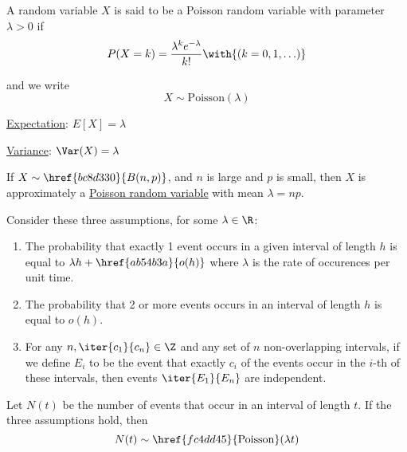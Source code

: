 \label{fc4dd45}

A random variable $X$ is said to be a Poisson random variable with parameter
$\lambda>0$ if
$$
  P(X=k)=\frac{\lambda^ke^{-\lambda}}{k!}\with{(k=0,1,\ldots)}
$$

and we write
$$
  X\sim\mathrm{Poisson}(\lambda)
$$

\label{f8bbae0}

\begin{enumerati}
  \item\href{ecb2162}{Expectation}: $E[X]=\lambda$
  \item\href{ddd95d5}{Variance}: $\Var(X)=\lambda$
\end{enumerati}

\label{cfda281}

If $X\sim \href{bc8d330}{B(n,p)}$, and $n$ is large and $p$ is small, then $X$
is approximately a \href{fc4dd45}{Poisson random variable} with mean
$\lambda=np$.

\label{d544278}

Consider these three assumptions, for some $\lambda\in\R$:
\begin{enumerate}
  \item The probability that exactly 1 event occurs in a given interval of
        length $h$ is equal to $\lambda h+\href{ab54b3a}{o(h)}$ where $\lambda$
        is the rate of occurences per unit time.
  \item The probability that 2 or more events occurs in an interval of length
        $h$ is equal to $o(h)$.
  \item For any $n,\iter{c_1}{c_n}\in\Z$ and any set of $n$ non-overlapping
        intervals, if we define $E_i$ to be the event that exactly $c_i$ of the
        events occur in the $i$-th of these intervals, then events
        $\iter{E_1}{E_n}$ are independent.
\end{enumerate}

Let $N(t)$ be the number of events that occur in an interval of length $t$. If
the three assumptions hold, then
$$
  N(t)\sim\href{fc4dd45}{\mathrm{Poisson}}(\lambda t)
$$
